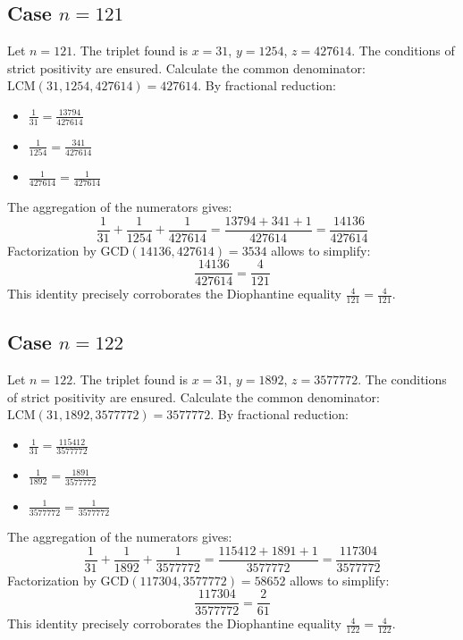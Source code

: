 \documentclass[11pt,a4paper]{article}
\begin{document}
\subsection{Case $n = 121$}
Let $n = 121$. The triplet found is $x = 31$, $y = 1254$, $z = 427614$.
The conditions of strict positivity are ensured.
Calculate the common denominator: $\text{LCM}(31, 1254, 427614) = 427614$.
By fractional reduction:
\begin{itemize}
    \item $\frac{1}{31} = \frac{13794}{427614}$
    \item $\frac{1}{1254} = \frac{341}{427614}$
    \item $\frac{1}{427614} = \frac{1}{427614}$
\end{itemize}
The aggregation of the numerators gives:
$$ \frac{1}{31} + \frac{1}{1254} + \frac{1}{427614} = \frac{13794 + 341 + 1}{427614} = \frac{14136}{427614} $$
Factorization by $\text{GCD}(14136, 427614) = 3534$ allows to simplify:
$$ \frac{14136}{427614} = \frac{4}{121} $$
This identity precisely corroborates the Diophantine equality $\frac{4}{121} = \frac{4}{121}$.

\subsection{Case $n = 122$}
Let $n = 122$. The triplet found is $x = 31$, $y = 1892$, $z = 3577772$.
The conditions of strict positivity are ensured.
Calculate the common denominator: $\text{LCM}(31, 1892, 3577772) = 3577772$.
By fractional reduction:
\begin{itemize}
    \item $\frac{1}{31} = \frac{115412}{3577772}$
    \item $\frac{1}{1892} = \frac{1891}{3577772}$
    \item $\frac{1}{3577772} = \frac{1}{3577772}$
\end{itemize}
The aggregation of the numerators gives:
$$ \frac{1}{31} + \frac{1}{1892} + \frac{1}{3577772} = \frac{115412 + 1891 + 1}{3577772} = \frac{117304}{3577772} $$
Factorization by $\text{GCD}(117304, 3577772) = 58652$ allows to simplify:
$$ \frac{117304}{3577772} = \frac{2}{61} $$
This identity precisely corroborates the Diophantine equality $\frac{4}{122} = \frac{4}{122}$.
\end{document}
